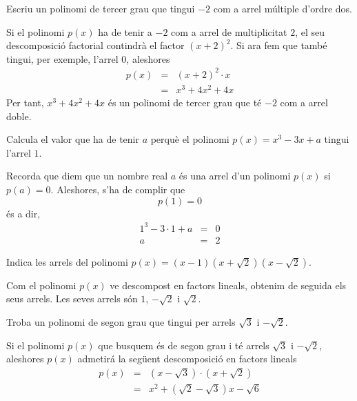 \begin{exercici}
Escriu un polinomi de tercer grau que tingui $-2$ com a arrel múltiple d'ordre dos.
\end{exercici}

\begin{solucio}
Si el polinomi $p(x)$ ha de tenir a $-2$ com a arrel de multiplicitat $2$, el seu descomposició factorial contindrà el factor $(x+2)^{2}$. Si
ara fem que també tingui, per exemple, l'arrel $0$, aleshores\begin{eqnarray*}
p(x) &=&(x+2)^{2}\cdot x \\
&=&x^{3}+4x^{2}+4x
\end{eqnarray*}Per tant, $x^{3}+4x^{2}+4x$ és un polinomi de tercer grau que té $-2$
com a arrel doble.
\end{solucio}

\begin{exercici}
Calcula el valor que ha de tenir $a$ perquè el polinomi $p(x)=x^{3}-3x+a$
tingui l'arrel $1$.
\end{exercici}

\begin{solucio}
Recorda que diem que un nombre real $a$ és una arrel d'un
polinomi $p(x)$ si $p(a)=0$. Aleshores, s'ha de complir que\[
p(1)=0
\]és a dir,\begin{eqnarray*}
1^{3}-3\cdot 1+a &=&0 \\
a &=&2
\end{eqnarray*}
\end{solucio}

\begin{exercici}
Indica les arrels del polinomi $p(x)=(x-1)(x+\sqrt{2})(x-\sqrt{2})$.
\end{exercici}

\begin{solucio}
Com el polinomi $p(x)$ ve descompost en factors lineals, obtenim
de seguida els seus arrels. Les seves arrels són $1$, $-\sqrt{2}$ i $\sqrt{2}$.
\end{solucio}

\begin{exercici}
Troba un polinomi de segon grau que tingui per arrels $\sqrt{3}$ i $-\sqrt{2}$.
\end{exercici}

\begin{solucio}
Si el polinomi $p(x)$ que busquem és de segon grau i té arrels $\sqrt{3}$ i $-\sqrt{2}$, aleshores $p(x)$ admetirá la següent
descomposició en factors lineals\begin{eqnarray*}
p(x) &=&\left( x-\sqrt{3}\right) \cdot \left( x+\sqrt{2}\right) \\
&=&x^{2}+\left( \sqrt{2}-\sqrt{3}\right) x-\sqrt{6}
\end{eqnarray*}
\end{solucio}


